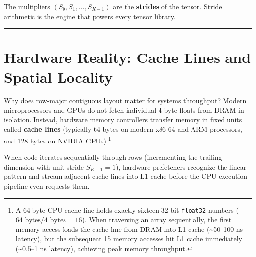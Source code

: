 \documentclass[
  letterpaper,
]{scrbook}
\begin{document}
The multipliers \((S_0, S_1, \dots, S_{K-1})\) are the \textbf{strides}
of the tensor. Stride arithmetic is the engine that powers every tensor
library.

\begin{center}\rule{0.5\linewidth}{0.5pt}\end{center}

\section{Hardware Reality: Cache Lines and Spatial
Locality}\label{hardware-reality-cache-lines-and-spatial-locality}

Why does row-major contiguous layout matter for systems throughput?
Modern microprocessors and GPUs do not fetch individual 4-byte floats
from DRAM in isolation. Instead, hardware memory controllers transfer
memory in fixed units called \textbf{cache lines} (typically 64 bytes on
modern x86-64 and ARM processors, and 128 bytes on NVIDIA
GPUs).\footnote{A 64-byte CPU cache line holds exactly sixteen 32-bit
  \texttt{float32} numbers (\(64\text{ bytes} / 4\text{ bytes} = 16\)).
  When traversing an array sequentially, the first memory access loads
  the cache line from DRAM into L1 cache (\textasciitilde50--100 ns
  latency), but the subsequent 15 memory accesses hit L1 cache
  immediately (\textasciitilde0.5--1 ns latency), achieving peak memory
  throughput.}

\begin{figure}[H]


\caption{\label{fig-cache-locality}}

\end{figure}%

When code iterates sequentially through rows (incrementing the trailing
dimension with unit stride \(S_{K-1} = 1\)), hardware prefetchers
recognize the linear pattern and stream adjacent cache lines into L1
cache before the CPU execution pipeline even requests them.
\end{document}
